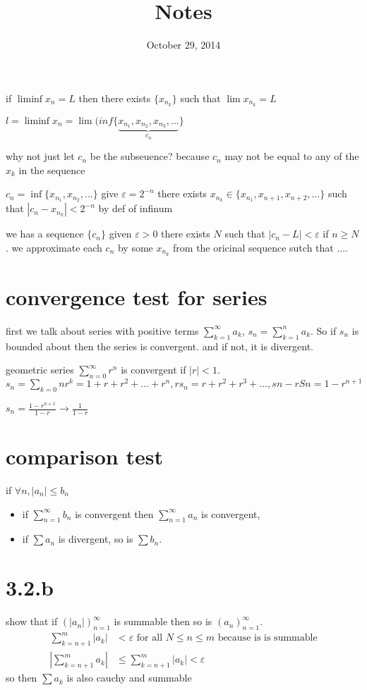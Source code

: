 \documentclass[letterpaper]{article}
\begin{document}
\title{Notes}
\date{October 29, 2014}
\maketitle
if $\liminf x_n=L$ then there exists $\{x_{n_k}\}$ such that $\lim x_{n_k}=L$

$l=\liminf x_n=\lim(inf\{\underbrace{x_{n_1},x_{n_2},x_{n_3},\dots}_{c_n}\}$

why not just let $c_n$ be the subseuence? because $c_n$ may not be equal to any of the $x_k$ in the sequence

$c_n=\inf\{x_{n_1},x_{n_2},\dots\}$ give $\varepsilon=2^{-n}$ there exists $x_{n_k}\in\{x_{n_1},x_{n+1},x_{n+2},\dots\}$ such that $\left\lvert c_n-x_{n_k}\right\rvert<2^{-n}$ by def of infinum

we has a sequence $\{c_n\}$ given $\varepsilon>0$ there exists $N$ such that $\left\lvert c_n-L\right\rvert<\varepsilon$ if $n\ge N$. we approximate each $c_n$ by some $x_{n_k}$ from the oricinal sequence sutch that ....

\section*{convergence test for series}
first we talk about series with positive terms $\sum\limits_{k=1}^\infty{a_k}$, $s_n=\sum\limits_{k=1}^n{a_k}$. So if $s_n$ is bounded about then the series is convergent. and if not, it is divergent.

geometric series $\sum\limits_{n=0}^\infty{r^n}$ is convergent if $\left\lvert r\right\rvert<1$. $s_n=\sum\limits_{k=0}n{r^k}=1+r+r^2+\dots+r^n, rs_n=r+r^2+r^3+\dots, sn-rSn=1-r^{n+1}$

$s_n=\frac{1-r^{n+1}}{1-r}\to\frac{1}{1-r}$


\section*{comparison test}
if $\forall n, |a_n|\le b_n$
\begin{itemize}
\item
  if $\sum\limits_{n=1}^\infty{b_n}$ is convergent then $\sum\limits_{n=1}^\infty{a_n}$ is convergent,
  \item
  if $\sum\limits{a_n}$ is divergent, so is $\sum\limits{b_n}$.
\end{itemize}
\section*{3.2.b}
show that if $\left(|a_n|\right)_{n=1}^\infty$ is summable then so is $\left(a_n\right)_{n=1}^\infty$.
\begin{align*}
  \sum\limits_{k=n+1}^m{|a_k|}&<\varepsilon\text{ for all }N\le n\le m \text{ because is is summable}\\
  \left\lvert\sum\limits_{k=n+1}^m{a_k}\right\rvert&\le\sum\limits_{k=n+1}^m{|a_k|}<\varepsilon
\end{align*}
so then $\sum\limits{a_k}$ is also cauchy and summable
\end{document}
